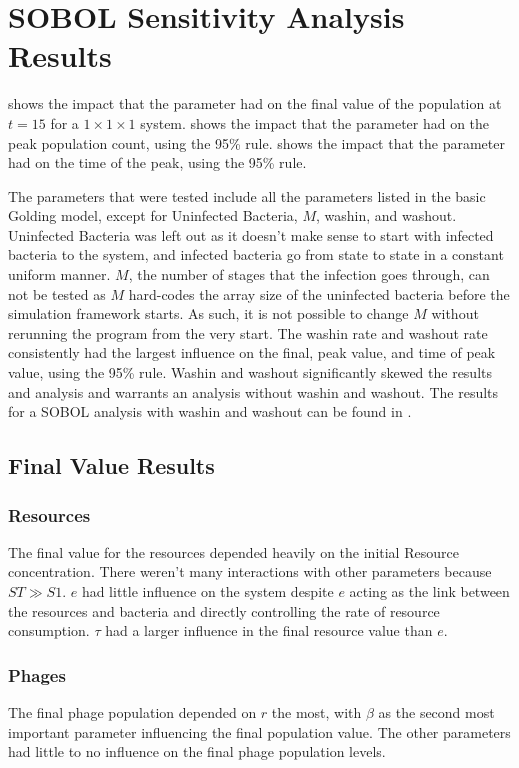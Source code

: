 \section{SOBOL Sensitivity Analysis Results}
\label{sec:SOBOL_sensitivity_analysis_results}

 shows the impact that the parameter had on the final value of the population at $t=15$ for a $1\times 1\times 1$ system. 
 shows the impact that the parameter had on the peak population count, using the 95\% rule. 
 shows the impact that the parameter had on the time of the peak, using the 95\% rule. 

The parameters that were tested include all the parameters listed in the basic Golding model, except for Uninfected Bacteria, $M$, washin, and washout. 
Uninfected Bacteria was left out as it doesn't make sense to start with infected bacteria to the system, and infected bacteria go from state to state in a constant uniform manner. 
$M$, the number of stages that the infection goes through, can not be tested as $M$ hard-codes the array size of the uninfected bacteria before the simulation framework starts. 
As such, it is not possible to change $M$ without rerunning the program from the very start. 
The washin rate and washout rate consistently had the largest influence on the final, peak value, and time of peak value, using the 95\% rule. 
Washin and washout significantly skewed the results and analysis and warrants an analysis without washin and washout. 
The results for a SOBOL analysis with washin and washout can be found in . 


\subsection{Final Value Results}
\subsubsection{Resources}
The final value for the resources depended heavily on the initial Resource concentration. 
There weren't many interactions with other parameters because $ST \gg S1$. 
$e$ had little influence on the system despite $e$ acting as the link between the resources and bacteria and directly controlling the rate of resource consumption. 
$\tau$ had a larger influence in the final resource value than $e$. 
\subsubsection{Phages}
The final phage population depended on $r$ the most, with $\beta$ as the second most important parameter influencing the final population value. 
The other parameters had little to no influence on the final phage population levels. 
